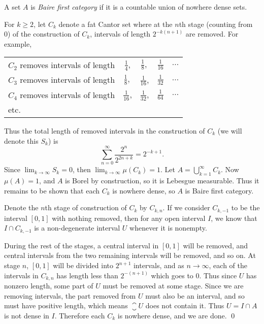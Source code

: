 \documentclass[12pt,letterpaper]{article}
\begin{document}
\begin{definition*}
A set $A$ is \emph{Baire first category} if it is a countable union of nowhere dense sets.
\end{definition*}

\answer For $k\geq 2$, let $C_k$ denote a fat Cantor set where at the $n$th stage (counting from 0) of the construction of $C_k$, intervals of length $2^{-k(n+1)}$ are removed. For example, 
\begin{center}
\begin{tabular}{lcccl}
$C_2$ removes intervals of length &$\frac{1}{4}$, &$\frac{1}{8},$ &$\frac{1}{16}$ &$\ldots$ \\
$C_3$ removes intervals of length &$\frac{1}{8},$ &$\frac{1}{16}$, & $\frac{1}{32}$ &$\ldots$ \\
$C_4$ removes intervals of length &$\frac{1}{16}$, & $\frac{1}{32}$, &$\frac{1}{64}$ &$\ldots$ \\
etc.
\end{tabular}
\end{center}
Thus the total length of removed intervals in the construction of $C_k$ (we will denote this $S_k$) is 
\[\sum_{n=0}^\infty \frac{2^{n}}{2^{2n+k}}
=2^{-k+1}.
\]
Since $\lim_{k\to\infty} S_k = 0$, then $\lim_{k\to\infty}\mu(C_k)=1$. Let $A=\bigcup_{k=1}^\infty C_k$. Now $\mu(A)=1$, and $A$ is Borel by construction, so it is Lebesgue measurable. Thus it remains to be shown that each $C_k$ is nowhere dense, so $A$ is Baire first category. 

Denote the $n$th stage of construction of $C_k$ by $C_{k,n}$. If we consider $C_{k,-1}$ to be the interval $[0,1]$ with nothing removed, then for any open interval $I$, we know that $I\cap C_{k,-1}$ is a non-degenerate interval $U$ whenever it is nonempty.

During the rest of the stages, a central interval in $[0,1]$ will be removed, and central intervals from the two remaining intervals will be removed, and so on. At stage $n$, $[0,1]$ will be divided into $2^{n+1}$ intervals, and as $n\to \infty$, each of the intervals in $C_{k,n}$ has length less than $2^{-(n+1)}$ which goes to $0$. Thus since $U$ has nonzero length, some part of $U$ must be removed at some stage. Since we are removing intervals, the part removed from $U$ must also be an interval, and so must have positive length, which means $\closure{U}$ does not contain it. Thus $U=I\cap A$ is not dense in $I$. Therefore each $C_k$ is nowhere dense, and we are done.
 \qed
\end{document}

